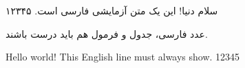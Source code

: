 \documentclass{article}
\begin{document}
سلام دنیا! این یک متن آزمایشی فارسی است. ۱۲۳۴۵

عدد فارسی، جدول و فرمول هم باید درست باشند.

\begin{otherlanguage}{english}
Hello world! This English line must always show. 12345
\end{otherlanguage}
\end{document}
